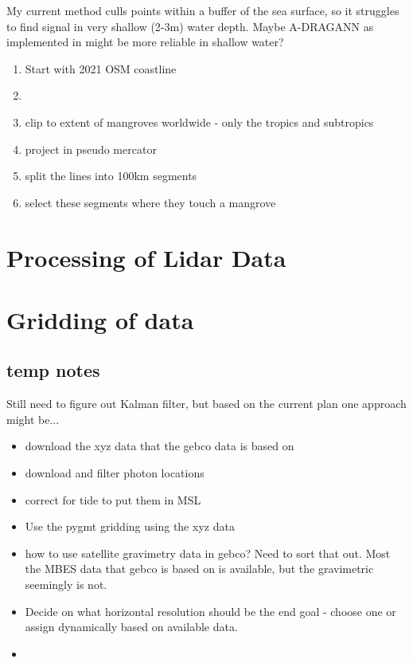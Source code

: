 My current method culls points within a buffer of the sea surface, so it struggles to find signal in very shallow (2-3m) water depth. Maybe A-DRAGANN as implemented in \cite{Cao2021} might be more reliable in shallow water?
\begin{enumerate}
    \color{orange}
    \item Start with 2021 OSM coastline
    \item 
    \item clip to extent of mangroves worldwide - only the tropics and subtropics
    \item project in pseudo mercator
    \item split the lines into 100km segments
    \item select these segments where they touch a mangrove 
\end{enumerate}


\section{Processing of Lidar Data}

\section{Gridding of data}
\subsection{temp notes}
Still need to figure out Kalman filter, but based on the current plan one approach might be...
\begin{itemize}
    \color{orange}
    \item download the xyz data that the gebco data is based on
    \item download and filter photon locations
    \item correct for tide to put them in MSL
    \item Use the pygmt gridding using the xyz data
    \item how to use satellite gravimetry data in gebco? Need to sort that out. Most the MBES data that gebco is based on is available, but the gravimetric seemingly is not.
    \item Decide on what horizontal resolution should be the end goal - choose one or assign dynamically based on available data. 
    \item 
\end{itemize}